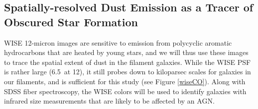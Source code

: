 \documentclass[11pt, preprint]{aastex}
\begin{document}
{%




\vspace*{-1cm}
\subsection{Spatially-resolved Dust Emission as a Tracer of Obscured Star Formation}
\vspace*{-.3cm}
\label{wise}
WISE 12-micron images are sensitive to emission from polycyclic
aromatic hydrocarbons that are heated by young stars, and we will thus
use these images to trace the spatial extent of dust in the filament
galaxies.  
While the WISE PSF is rather large
(6.5\arcsec \ at 12\micron), it
still probes down to kiloparsec scales for galaxies in our filaments,
and is sufficient for this study (see Figure \ref{wiseCO}).   Along with SDSS fiber
spectroscopy, the WISE colors will be used to identify galaxies with
infrared size measurements that are likely to be affected by an AGN.


}
\end{document}
